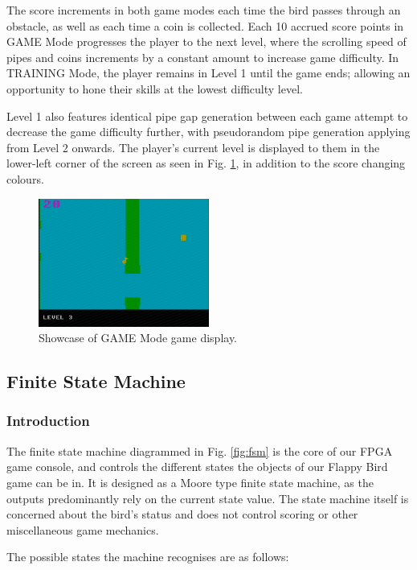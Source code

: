 \documentclass[conference]{IEEEtran}
\begin{document}
The score increments in both game modes each time the bird passes through an obstacle, as well as each time a coin is collected. Each 10 accrued score points in GAME Mode progresses the player to the next level, where the scrolling speed of pipes and coins increments by a constant amount to increase game difficulty. In TRAINING Mode, the player remains in Level 1 until the game ends; allowing an opportunity to hone their skills at the lowest difficulty level.

Level 1 also features identical pipe gap generation between each game attempt to decrease the game difficulty further, with pseudorandom pipe generation applying from Level 2 onwards. The player's current level is displayed to them in the lower-left corner of the screen as seen in Fig. \ref{fig:game-mode}, in addition to the score changing colours.

\begin{figure}[htbp]
    \centerline{\includegraphics[width=0.5\textwidth]{game-mode.png}}
    \caption{Showcase of GAME Mode game display.}
    \label{fig:game-mode}
\end{figure}

\subsection{Finite State Machine}
\subsubsection{Introduction}
The finite state machine diagrammed in Fig. \ref{fig:fsm} is the core of our FPGA game console, and controls the different states the objects of our Flappy Bird game can be in. It is designed as a Moore type finite state machine, as the outputs predominantly rely on the current state value. The state machine itself is concerned about the bird's status and does not control scoring or other miscellaneous game mechanics.

The possible states the machine recognises are as follows:
\end{document}
